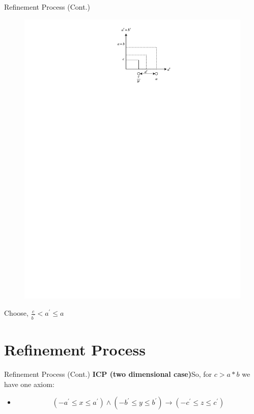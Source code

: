 \documentclass[]{beamer}
\begin{document}
\begin{frame}{Refinement Process (Cont.)}
\begin{overlayarea}{12cm}{5.5cm}
\begin{minipage}{5cm}
    		\vspace{1cm}
    		\begin{figure}	\includegraphics[scale=0.9]{../figures/ICP2_2.pdf}
    		\end{figure}
    		\centering
    		\vspace{-0.5cm}
    		Choose, $\frac{c}{b^\prime} < a^\prime \leq a$
    	\end{minipage}
    \end{overlayarea}
\end{frame}

\section{Refinement Process}
\begin{frame}{Refinement Process (Cont.)}
    \textbf{ICP (two dimensional case)}\newline So, for $c > a \ast b$ we have one axiom:
    \begin{itemize}
        \item $$(-a^\prime \leq x \leq a^\prime) \wedge (-b^\prime \leq y \leq b^\prime) \to (-c^\prime \leq z \leq c^\prime)$$
    \end{itemize}
\end{frame}
\end{document}
